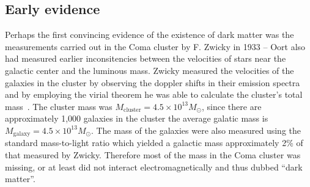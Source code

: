 \subsection{Early evidence}
Perhaps the first convincing evidence of the existence of dark matter
was the measurements carried out in the Coma cluster by F. Zwicky in
1933 -- Oort also had measured earlier inconsitencies between the
velocities of stars near the galactic center and the luminous
mass. Zwicky measured the velocities of the galaxies in the cluster by observing the
doppler shifts in their emission spectra and by employing the virial
theorem he was able to calculate the cluster's total mass~\cite{zwikcy1,ZZZZW}. The cluster
mass was $M_{\mathrm{cluster}} = 4.5\times10^{13}M_{\odot}$, since
there are approximately 1,000 galaxies in the cluster the average
galatic mass is $M_{\mathrm{galaxy}} = 4.5\times10^{13}M_{\odot}$. The
mass of the galaxies were also measured using the standard
mass-to-light ratio which yielded a galactic mass approximately 2\% of
that measured by Zwicky. Therefore most of the mass in the Coma
cluster was missing, or at least did not interact electromagnetically
and thus dubbed ``dark matter''.

